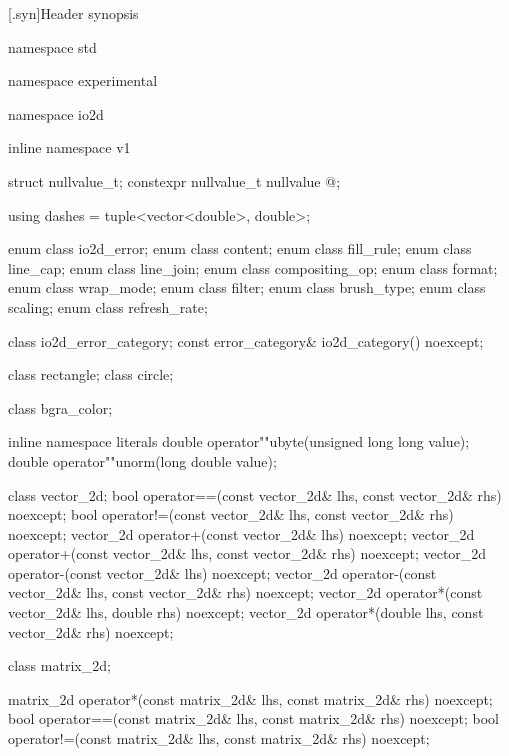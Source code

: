 [\iotwod.syn]{Header  synopsis}

%
\begin{codeblock}

namespace std { namespace experimental {
  namespace io2d { inline namespace v1 {

  struct nullvalue_t;
  constexpr nullvalue_t nullvalue{ @\impdef@ };

  using dashes = tuple<vector<double>, double>;

  enum class io2d_error;
  enum class content;
  enum class fill_rule;
  enum class line_cap;
  enum class line_join;
  enum class compositing_op;
  enum class format;
  enum class wrap_mode;
  enum class filter;
  enum class brush_type;
  enum class scaling;
  enum class refresh_rate;

  class io2d_error_category;
  const error_category& io2d_category() noexcept;

  class rectangle;
  class circle;

  class bgra_color;

  inline namespace literals {
    double operator""ubyte(unsigned long long value);
    double operator""unorm(long double value);
  }

  class vector_2d;
  bool operator==(const vector_2d& lhs, const vector_2d& rhs) noexcept;
  bool operator!=(const vector_2d& lhs, const vector_2d& rhs) noexcept;
  vector_2d operator+(const vector_2d& lhs) noexcept;
  vector_2d operator+(const vector_2d& lhs, const vector_2d& rhs) noexcept;
  vector_2d operator-(const vector_2d& lhs) noexcept;
  vector_2d operator-(const vector_2d& lhs, const vector_2d& rhs) noexcept;
  vector_2d operator*(const vector_2d& lhs, double rhs) noexcept;
  vector_2d operator*(double lhs, const vector_2d& rhs) noexcept;

  class matrix_2d;

  matrix_2d operator*(const matrix_2d& lhs, const matrix_2d& rhs) noexcept;
  bool operator==(const matrix_2d& lhs, const matrix_2d& rhs) noexcept;
  bool operator!=(const matrix_2d& lhs, const matrix_2d& rhs) noexcept;

}}}}
\end{codeblock}
